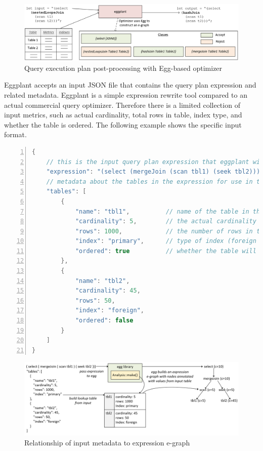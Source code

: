 \documentclass{article}
\begin{document}
\begin{figure}[H]
\centering
\begin{minipage}[b]{1.0\textwidth}
    \includegraphics[width=\textwidth]{optimizer.png}
    \caption{Query execution plan post-processing with Egg-based optimizer}
\end{minipage}
\hfill
\end{figure}

Eggplant accepts an input JSON file that contains the query plan expression and related metadata.
Eggplant is a simple expression rewrite tool compared to an actual commercial query optimizer.
Therefore there is a limited collection of input metrics, such as actual cardinality, total rows in table,
index type, and whether the table is ordered.  The following example shows the specific input format.

\begin{lstlisting}[language=c++,
    frame=single, numbers=left, numbersep=5pt, numberstyle=\tiny\color{mygray},stringstyle=\ttfamily]
{
    // this is the input query plan expression that eggplant will try to transform
    "expression": "(select (mergeJoin (scan tbl1) (seek tbl2)))",
    // metadata about the tables in the expression for use in the cost function
    "tables": [
        {
            "name": "tbl1",          // name of the table in the expression
            "cardinality": 5,        // the actual cardinality of the table in the query
            "rows": 1000,            // the number of rows in the table
            "index": "primary",      // type of index (foreign or primary)
            "ordered": true          // whether the table will be processed in sorted order
        },
        {
            "name": "tbl2",
            "cardinality": 45,
            "rows": 50,
            "index": "foreign",
            "ordered": false
        }
    ]
}
\end{lstlisting}

\begin{figure}[H]
\centering
\begin{minipage}[b]{1.0\textwidth}
    \includegraphics[width=\textwidth]{input_to_graph.png}
    \caption{Relationship of input metadata to expression e-graph}
\end{minipage}
\hfill
\end{figure}
\end{document}
